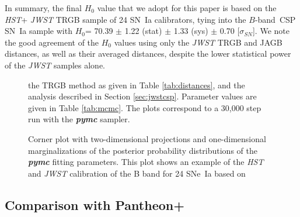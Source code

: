 \documentclass[12pt,modern]{aastex631}
\newcommand{\csp}{\,CSP\xspace}
\newcommand{\ho}{$H_{0}$\xspace}
\newcommand{\hst}{\emph{HST}\xspace}
\newcommand{\jwst}{\emph{JWST}\xspace}
\newcommand{\sne}{SNe~Ia\xspace}
\newcommand{\sn}{SN~Ia\xspace}
\begin{document}
In summary, the final \ho value that we adopt for this paper is based on the \hst + \jwst TRGB sample of 24 \sn calibrators,  tying into the $B$-band \csp \sn sample  with \ho = 70.39 $\pm$ 1.22 (stat) $\pm$ 1.33 (sys) $\pm$ 0.70 [$\sigma_{SN}$]. We note the good  agreement of the \ho values using only the \jwst TRGB and JAGB  distances, as well as  their averaged distances, despite the lower statistical power of the \jwst samples alone.


\begin{figure}[ht!]
\caption{Corner plot with  two-dimensional projections and one-dimensional marginalizations of the posterior probability distributions of the {\it \bf pymc} fitting parameters. This plot shows an example of the \hst and \jwst calibration of the B band for  24 \sne based on} the TRGB method
as given in Table \ref{tab:distances}, and  the analysis described in Section \ref{sec:jwstcsp}. Parameter values are given in Table \ref{tab:mcmc}. The plots correspond to a 30,000 step run with the {\it \bf pymc} sampler. 
\label{fig:corner}
\end{figure}




\subsection{Comparison with Pantheon+ }
\label{sec:pantheon}
\end{document}
